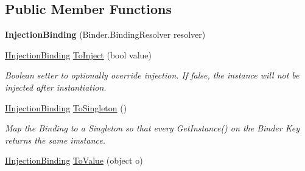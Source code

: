 \subsection*{Public Member Functions}
\begin{DoxyCompactItemize}
\item 
\hypertarget{classstrange_1_1extensions_1_1injector_1_1impl_1_1_injection_binding_ac7cd5da2e7c65f4e60dddc4adeb76aa3}{{\bfseries Injection\-Binding} (Binder.\-Binding\-Resolver resolver)}\label{classstrange_1_1extensions_1_1injector_1_1impl_1_1_injection_binding_ac7cd5da2e7c65f4e60dddc4adeb76aa3}

\item 
\hypertarget{classstrange_1_1extensions_1_1injector_1_1impl_1_1_injection_binding_a03d3a22f0e3cad47d20c337d7a5aa224}{\hyperlink{interfacestrange_1_1extensions_1_1injector_1_1api_1_1_i_injection_binding}{I\-Injection\-Binding} \hyperlink{classstrange_1_1extensions_1_1injector_1_1impl_1_1_injection_binding_a03d3a22f0e3cad47d20c337d7a5aa224}{To\-Inject} (bool value)}\label{classstrange_1_1extensions_1_1injector_1_1impl_1_1_injection_binding_a03d3a22f0e3cad47d20c337d7a5aa224}

\begin{DoxyCompactList}\small\item\em Boolean setter to optionally override injection. If false, the instance will not be injected after instantiation. \end{DoxyCompactList}\item 
\hypertarget{classstrange_1_1extensions_1_1injector_1_1impl_1_1_injection_binding_a0e91d1685d6518e622468bf26e55cd02}{\hyperlink{interfacestrange_1_1extensions_1_1injector_1_1api_1_1_i_injection_binding}{I\-Injection\-Binding} \hyperlink{classstrange_1_1extensions_1_1injector_1_1impl_1_1_injection_binding_a0e91d1685d6518e622468bf26e55cd02}{To\-Singleton} ()}\label{classstrange_1_1extensions_1_1injector_1_1impl_1_1_injection_binding_a0e91d1685d6518e622468bf26e55cd02}

\begin{DoxyCompactList}\small\item\em Map the Binding to a Singleton so that every {\ttfamily Get\-Instance()} on the Binder Key returns the same imstance. \end{DoxyCompactList}\item 
\hypertarget{classstrange_1_1extensions_1_1injector_1_1impl_1_1_injection_binding_a2d5492d1aec7dc4b48f5670e4eb35bde}{\hyperlink{interfacestrange_1_1extensions_1_1injector_1_1api_1_1_i_injection_binding}{I\-Injection\-Binding} \hyperlink{classstrange_1_1extensions_1_1injector_1_1impl_1_1_injection_binding_a2d5492d1aec7dc4b48f5670e4eb35bde}{To\-Value} (object o)}\label{classstrange_1_1extensions_1_1injector_1_1impl_1_1_injection_binding_a2d5492d1aec7dc4b48f5670e4eb35bde}


\end{DoxyCompactItemize}
